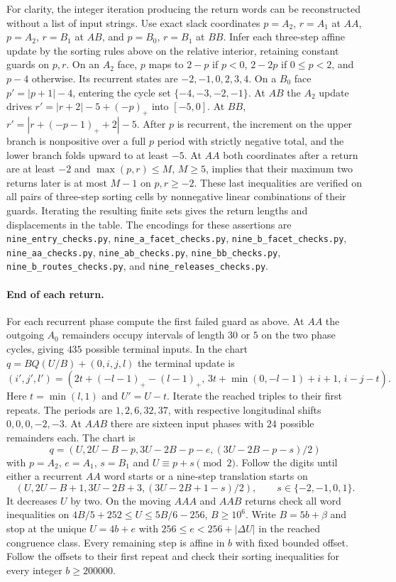 \documentclass[11pt,reqno]{amsart}
\newcommand{\file}[1]{\nolinkurl{#1}}
\begin{document}
For clarity, the integer iteration producing the return words can be
reconstructed without a list of input strings. Use exact slack coordinates
$p=A_2$, $r=A_1$ at $AA$, $p=A_2$, $r=B_1$ at $AB$, and $p=B_0$,
$r=B_1$ at $BB$. Infer each three-step affine update by the sorting rules
above on the relative interior, retaining constant guards on $p,r$. On an
$A_2$ face, $p$ maps to $2-p$ if $p<0$, $2-2p$ if $0\le p<2$, and $p-4$
otherwise. Its recurrent states are $-2,-1,0,2,3,4$. On a $B_0$ face
$p'=|p+1|-4$, entering the cycle set $\{-4,-3,-2,-1\}$.
At $AB$ the $A_2$ update drives $r'=|r+2|-5+(-p)_+$ into $[-5,0]$.
At $BB$, $r'=|r+(-p-1)_++2|-5$. After $p$ is recurrent, the increment
on the upper branch is nonpositive over a full $p$ period with strictly
negative total, and the lower branch folds upward to at least $-5$.
At $AA$ both coordinates after a return are at least $-2$ and
$\max(p,r)\le M$, $M\ge5$, implies that their maximum two returns later
is at most $M-1$ on $p,r\ge-2$. These last inequalities are verified
on all pairs of three-step sorting cells by nonnegative linear combinations
of their guards. Iterating the resulting finite sets gives the return
lengths and displacements in the table.
The encodings for these assertions are \file{nine_entry_checks.py},
\file{nine_a_facet_checks.py}, \file{nine_b_facet_checks.py},
\file{nine_aa_checks.py}, \file{nine_ab_checks.py}, \file{nine_bb_checks.py},
\file{nine_b_routes_checks.py}, and \file{nine_releases_checks.py}.

\paragraph{End of each return.}
For each recurrent phase compute the first failed guard as above. At
$AA$ the outgoing $A_0$ remainders occupy intervals of length $30$ or
$5$ on the two phase cycles, giving $435$ possible terminal inputs.
In the chart $q=BQ(U/B)+(0,i,j,l)$ the terminal update is
\[
 (i',j',l')=(2t+(-l-1)_+-(l-1)_+,\,3t+\min(0,-l-1)+i+1,\,i-j-t).
\]
Here $t=\min(l,1)$ and $U'=U-t$. Iterate the reached triples to their first repeats.
The periods are $1,2,6,32,37$, with respective longitudinal shifts $0,0,0,-2,-3$. At $AAB$ there are sixteen input phases with $24$ possible remainders
each. The chart is
\[
 q=(U,2U-B-p,3U-2B-p-e,(3U-2B-p-s)/2)
\]
with $p=A_2$, $e=A_1$, $s=B_1$ and $U\equiv p+s\pmod2$.
Follow the digits until either a recurrent $AA$ word starts or a
nine-step translation starts on
\[
 (U,2U-B+1,3U-2B+3,(3U-2B+1-s)/2),
 \qquad s\in\{-2,-1,0,1\}.
\]
It decreases $U$ by two. On the moving $AAA$ and $AAB$ returns check
all word inequalities on $4B/5+252\le U\le5B/6-256$, $B\ge10^6$.
Write $B=5b+\beta$ and stop at the unique $U=4b+e$ with
$256\le e<256+|\Delta U|$ in the reached congruence class.
Every remaining step is affine in $b$ with fixed bounded offset.
Follow the offsets to their first repeat and check their sorting
inequalities for every integer $b\ge200000$.
\end{document}
